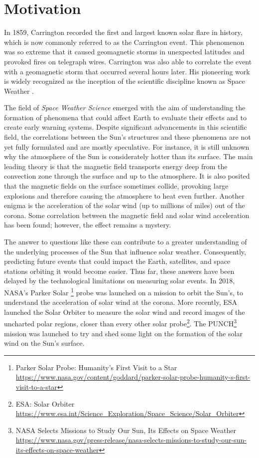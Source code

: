 
\section{Motivation} \label{sec:motivation}
In 1859, Carrington recorded the first and largest known solar flare in history, which is now commonly referred to as the Carrington event. This phenomenon was so extreme that it caused geomagnetic storms in unexpected latitudes and provoked fires on telegraph wires.  Carrington was also able to correlate the event with a geomagnetic storm that occurred several hours later. His pioneering work is widely recognized as the inception of the scientific discipline known as Space Weather \cite{schwenn_SpaceWeatherSolar_2006}.

The field of \textit{Space Weather Science} emerged with the aim of understanding the formation of phenomena that could affect Earth to evaluate their effects and to create early warning systems. Despite significant advancements in this scientific field, the correlations between the Sun's structures and these phenomena are not yet fully formulated and are mostly speculative.  For instance, it is still unknown why the atmosphere of the Sun is considerately hotter than its surface. The main leading theory is that the magnetic field transports energy deep from the convection zone through the surface and up to the atmosphere. It is also posited that the magnetic fields on the surface sometimes collide, provoking large explosions and therefore causing the atmosphere to heat even further. Another enigma is the acceleration of the solar wind (up to millions of miles) out of the corona. Some correlation between the magnetic field and solar wind acceleration has been found; however, the effect remains a mystery.

The answer to questions like these can contribute to a greater understanding of the underlying processes of the Sun that influence solar weather. Consequently, predicting future events that could impact the Earth, satellites, and space stations orbiting it would become easier. Thus far, these answers have been delayed by the technological limitations on measuring solar events. In 2018, NASA's Parker Solar \footnote{Parker Solar Probe: Humanity’s First Visit to a Star \url{https://www.nasa.gov/content/goddard/parker-solar-probe-humanity-s-first-visit-to-a-star}} probe was launched on a mission to orbit the Sun's, to understand the acceleration of solar wind at the corona. More recently, ESA launched the Solar Orbiter to measure the solar wind and record images of the uncharted polar regions, closer than every other solar probe\footnote{ESA: Solar Orbiter \url{https://www.esa.int/Science_Exploration/Space_Science/Solar_Orbiter}}. The PUNCH\footnote{NASA Selects Missions to Study Our Sun, Its Effects on Space Weather \url{https://www.nasa.gov/press-release/nasa-selects-missions-to-study-our-sun-its-effects-on-space-weather}} mission was launched to try and shed some light on the formation of the solar wind on the Sun's surface.

